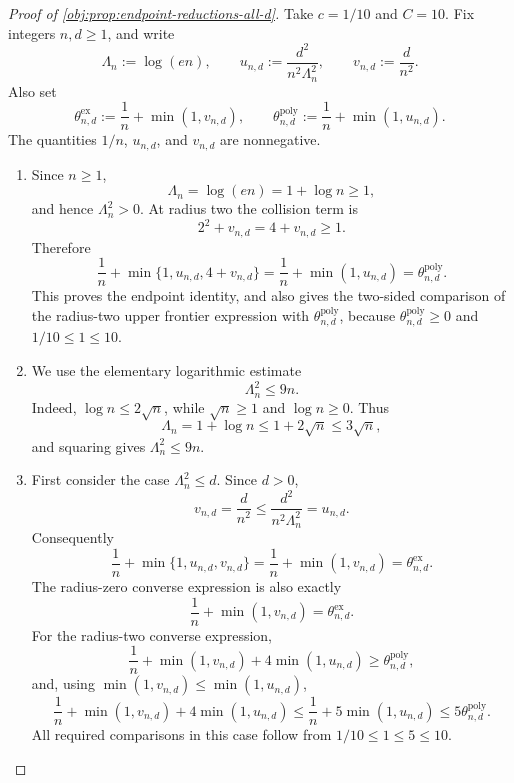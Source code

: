 \begin{proof}[Proof of \cref{obj:prop:endpoint-reductions-all-d}]
Take \(c=1/10\) and \(C=10\).  Fix integers \(n,d\ge1\), and write
\[
\Lambda_n:=\log(en),\qquad
u_{n,d}:=\frac{d^2}{n^2\Lambda_n^2},\qquad
v_{n,d}:=\frac d{n^2}.
\]
Also set
\[
\theta^{\mathrm{ex}}_{n,d}:=\frac1n+\min(1,v_{n,d}),
\qquad
\theta^{\mathrm{poly}}_{n,d}:=\frac1n+\min(1,u_{n,d}).
\]
The quantities \(1/n\), \(u_{n,d}\), and \(v_{n,d}\) are nonnegative.

\begin{enumerate}
\item Since \(n\ge1\),
\[
\Lambda_n
=\log(en)=1+\log n\ge1,
\]
and hence \(\Lambda_n^2>0\).  At radius two the collision term is
\[
2^2+v_{n,d}=4+v_{n,d}\ge1.
\]
Therefore
\[
\frac1n+\min\{1,u_{n,d},4+v_{n,d}\}
=\frac1n+\min(1,u_{n,d})
=\theta^{\mathrm{poly}}_{n,d}.
\]
This proves the endpoint identity, and also gives the two-sided comparison of the
radius-two upper frontier expression with \(\theta^{\mathrm{poly}}_{n,d}\), because
\(\theta^{\mathrm{poly}}_{n,d}\ge0\) and \(1/10\le1\le10\).

\item We use the elementary logarithmic estimate
\[
\Lambda_n^2\le 9n.
\]
Indeed, \(\log n\le 2\sqrt n\), while \(\sqrt n\ge1\) and \(\log n\ge0\).  Thus
\[
\Lambda_n=1+\log n\le 1+2\sqrt n\le3\sqrt n,
\]
and squaring gives \(\Lambda_n^2\le9n\).

\item First consider the case \(\Lambda_n^2\le d\).  Since \(d>0\),
\[
v_{n,d}=\frac d{n^2}
\le
\frac{d^2}{n^2\Lambda_n^2}
=u_{n,d}.
\]
Consequently
\[
\frac1n+\min\{1,u_{n,d},v_{n,d}\}
=
\frac1n+\min(1,v_{n,d})
=
\theta^{\mathrm{ex}}_{n,d}.
\]
The radius-zero converse expression is also exactly
\[
\frac1n+\min(1,v_{n,d})=\theta^{\mathrm{ex}}_{n,d}.
\]
For the radius-two converse expression,
\[
\frac1n+\min(1,v_{n,d})+4\min(1,u_{n,d})
\ge
\theta^{\mathrm{poly}}_{n,d},
\]
and, using \(\min(1,v_{n,d})\le\min(1,u_{n,d})\),
\[
\frac1n+\min(1,v_{n,d})+4\min(1,u_{n,d})
\le
\frac1n+5\min(1,u_{n,d})
\le
5\theta^{\mathrm{poly}}_{n,d}.
\]
All required comparisons in this case follow from \(1/10\le1\le5\le10\).


\end{enumerate}
\end{proof}

